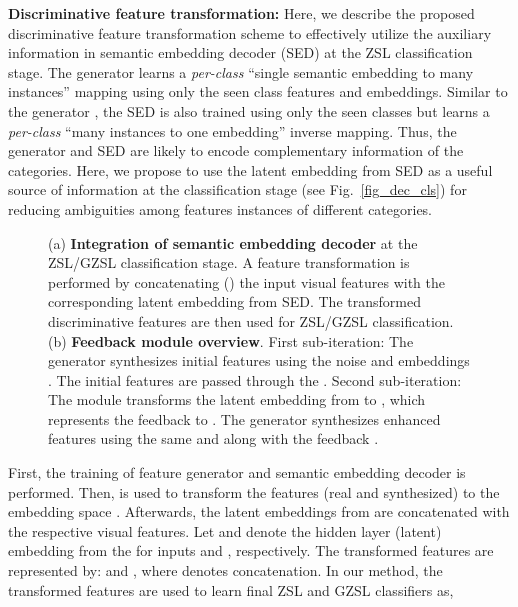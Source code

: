 \documentclass[runningheads]{llncs}
\begin{document}
\noindent\textbf{Discriminative feature transformation:}
Here, we describe the proposed discriminative feature transformation scheme to effectively utilize the auxiliary information in semantic embedding decoder (SED) at the ZSL classification stage. The generator  learns a \emph{per-class} \enquote{single semantic embedding to many instances} mapping using only the seen class features and embeddings.
Similar to the generator , the SED is also trained using only the seen classes but learns a \emph{per-class} \enquote{many instances to one embedding} inverse mapping. Thus, the generator  and SED  are likely to encode complementary information of the categories.  Here, we propose to use the latent embedding from SED as a useful source of information at the classification stage (see Fig.~\ref{fig_dec_cls}) for reducing ambiguities among features instances of different categories. 
\begin{figure}[t]
\begin{minipage}{0.5\textwidth}
    \end{minipage}\begin{minipage}{0.5\textwidth}
    \centering
\end{minipage}\caption{(a) \textbf{Integration of semantic embedding decoder}  at the ZSL/GZSL classification stage. A feature transformation is performed by concatenating () the input visual features  with the corresponding latent embedding  from SED. The transformed discriminative features are then used for ZSL/GZSL classification. \\ (b) \textbf{Feedback module overview}. First sub-iteration: The generator  synthesizes initial features  using the noise  and embeddings . The initial features are passed through the . Second sub-iteration: The module  transforms the latent embedding  from  to , which represents the feedback to . The generator  synthesizes enhanced features  using the same  and  along with the feedback .}\end{figure}

First, the training of feature generator  and semantic embedding decoder  is performed. Then,  is used to transform the features (real and synthesized) to the embedding space . Afterwards, the latent embeddings from  are concatenated with the respective visual features. Let  and  denote the hidden layer (latent) embedding from the  for inputs  and , respectively. The transformed features are represented by:  and , where  denotes concatenation. In our method, the transformed features are used to learn final ZSL and GZSL classifiers as,
\end{document}
